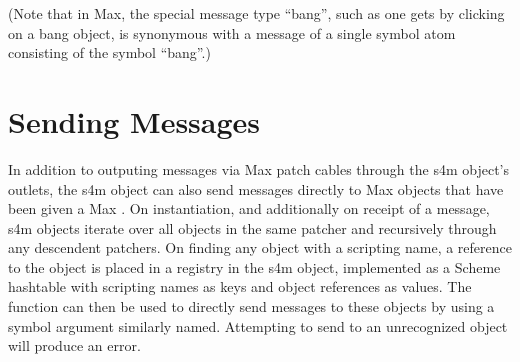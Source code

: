 \documentclass[letterpaper,10pt,english]{sphinxmanual}
\begin{document}
\begin{sphinxVerbatim}[commandchars=\\\{\}]
\end{sphinxVerbatim}

\sphinxAtStartPar
(Note that in Max, the special message type “bang”, such as one gets by clicking on a bang object,
is synonymous with a message of a single symbol atom consisting of the symbol “bang”.)


\section{Sending Messages}
\label{\detokenize{features_usage:sending-messages}}
\sphinxAtStartPar
In addition to outputing messages via Max patch cables through the s4m object’s outlets,
the s4m object can also send messages directly to Max objects that have been given a Max .
On instantiation, and additionally on receipt of a  message, s4m objects
iterate over all objects in the same patcher and recursively through
any descendent patchers. On finding any object with a scripting name, a reference
to the object is placed in a registry in the s4m object, implemented as a Scheme hash\sphinxhyphen{}table
with scripting names as keys and object references as values.
The  function can then be used to directly send messages to these objects by using
a symbol argument similarly named.
Attempting to send to an unrecognized object will produce an error.
\end{document}
